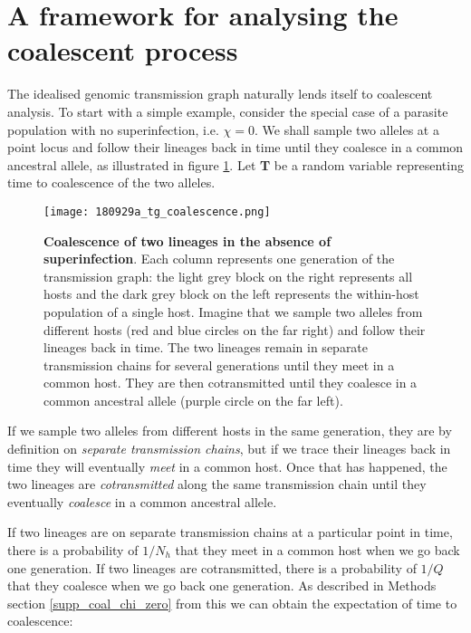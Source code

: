 \documentclass[_main.tex]{subfiles}
\begin{document}
\section*{A framework for analysing the coalescent process}  
\label{main_coalescent}

The idealised genomic transmission graph naturally lends itself to coalescent analysis.  To start with a simple example, consider the special case of a parasite population with no superinfection, i.e. $\chi =0$.  We shall sample two alleles at a point locus and follow their lineages back in time until they coalesce in a common ancestral allele, as illustrated in figure \ref{fig:coalescent}.  Let \textbf{T} be a random variable representing time to coalescence of the two alleles.

\begin{figure}[htb]
\centering
\texttt{[image: 180929a\_tg\_coalescence.png]}
\caption{\textbf{Coalescence of two lineages in the absence of superinfection}. Each column represents one generation of the transmission graph: the light grey block on the right represents all hosts and the dark grey block on the left represents the within-host population of a single host.  Imagine that we sample two alleles from different hosts (red and blue circles on the far right) and follow their lineages back in time.  The two lineages remain in separate transmission chains for several generations until they meet in a common host.  They are then cotransmitted until they coalesce in a common ancestral allele (purple circle on the far left).}
\label{fig:coalescent}
\end{figure}

If we sample two alleles from different hosts in the same generation, they are by definition on \textit{separate transmission chains}, but if we trace their lineages back in time they will eventually \textit{meet} in a common host.  Once that has happened, the two lineages are \textit{cotransmitted} along the same transmission chain until they eventually \textit{coalesce} in a common ancestral allele. 

If two lineages are on separate transmission chains at a particular point in time, there is a probability of $1/N_h$ that they meet in a common host when we go back one generation.  If two lineages are cotransmitted, there is a probability of $1/Q$ that they coalesce when we go back one generation.  As described in Methods section \ref{supp_coal_chi_zero} from this we can obtain the expectation of time to coalescence:
\end{document}
